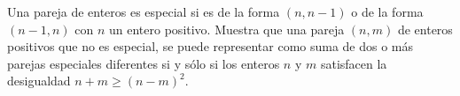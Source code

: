 Una pareja de enteros es especial si es de la forma $(n, n - 1)$ o de la forma $(n - 1, n)$ con $n$ un entero positivo. Muestra que una pareja $(n, m)$ de enteros positivos que no es especial, se puede representar como suma de dos o más parejas especiales diferentes si y sólo si los enteros $n$ y $m$ satisfacen la desigualdad $n + m \geq (n - m)^2$.